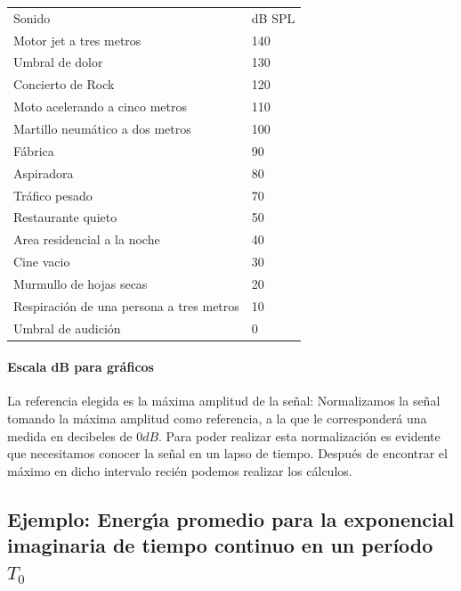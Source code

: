 \begin{tabular}{ll}
  Sonido                                          &       dB SPL  \\
  Motor jet a tres metros                         &       140     \\
  Umbral de dolor                                 &       130     \\
  Concierto de Rock                               &       120     \\
  Moto acelerando a cinco metros                  &       110     \\
  Martillo neum\'{a}tico a dos metros             &       100     \\
  F\'{a}brica                                     &       90      \\
  Aspiradora                                      &       80      \\
  Tr\'{a}fico pesado                              &       70      \\
  Restaurante quieto                              &       50      \\
  Area residencial a la noche                     &       40      \\
  Cine vacio                                      &       30      \\
  Murmullo de hojas secas                         &       20      \\
  Respiraci\'{o}n de una persona a tres metros    &       10      \\
  Umbral de audici\'{o}n                          &       0       
\end{tabular}

\paragraph{Escala dB para gr\'{a}ficos} 
La referencia elegida es la m\'{a}xima amplitud de la se\~{n}al:  Normalizamos la se\~{n}al tomando la m\'{a}xima amplitud como referencia,
a la que le corresponderá una medida en decibeles de $0 dB$. 
Para poder realizar esta normalizaci\'{o}n es evidente que necesitamos
conocer la se\~{n}al en un lapso de tiempo. Despu\'{e}s de encontrar
el m\'{a}ximo en dicho intervalo reci\'{e}n podemos realizar los
c\'{a}lculos.

\subsection{Ejemplo: Energ\'{\i}a promedio para la exponencial imaginaria de tiempo continuo en un período $T_{0}$}

